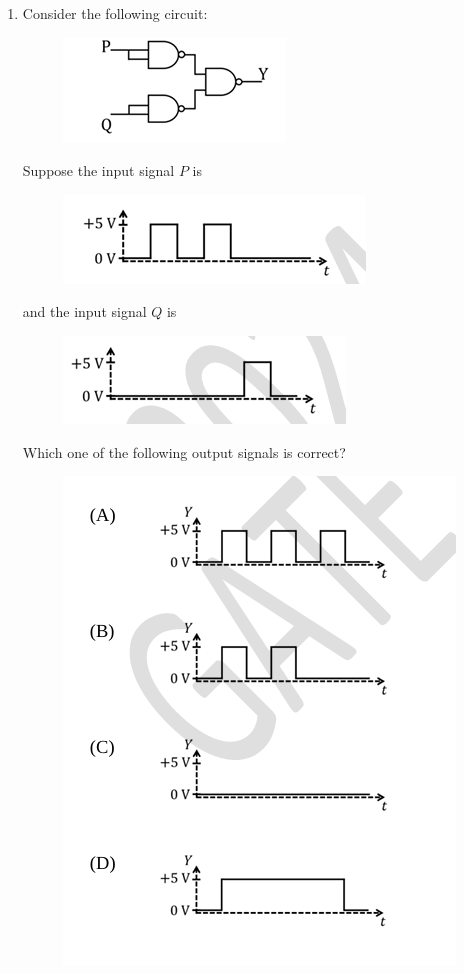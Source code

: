 \documentclass[journal,12pt,onecolumn]{IEEEtran}
\theoremstyle{remark}
\begin{document}
\begin{enumerate}
\begin{enumerate}
\end{enumerate}

\item Consider the following circuit:
\begin{figure}[H]
    \centering
    \includegraphics[width = 0.4\columnwidth]{fig/Q24(1).png}
    \caption*{}
    \label{fig: Q24}
\end{figure}
Suppose the input signal $P$ is
\begin{figure}[H]
    \centering
    \includegraphics[width = 0.4\columnwidth]{fig/Q24(2).png}
    \caption*{}
    \label{fig: Q24}
\end{figure}
and the input signal $Q$ is
\begin{figure}[H]
    \centering
    \includegraphics[width = 0.4\columnwidth]{fig/Q24(3).png}
    \caption*{}
    \label{fig: Q24}
\end{figure}
Which one of the following output signals is correct?
\begin{figure}[H]
    \centering
    \includegraphics[width = 0.5\columnwidth]{fig/Q24(4).png}

\end{figure}
\end{enumerate}
\end{document}
